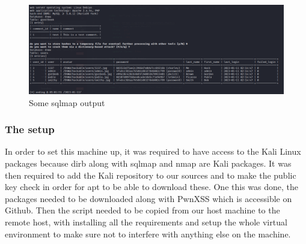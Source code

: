 \documentclass[a4paper,12pt,fleqn]{article}
\begin{document}
\begin{figure}[h]
    \centering
    \includegraphics[scale = 0.3]{images/sqlmap.png}
    \caption{Some sqlmap output}
\end{figure}

\subsubsection{The setup}

In order to set this machine up, it was required to have access to the Kali Linux packages because dirb along with sqlmap and nmap are Kali packages. It was then required to add the Kali repository to our sources and to make the public key check in order for apt to be able to download these. One this was done, the packages needed to be downloaded along with PwnXSS which is accessible on Github. Then the script needed to be copied from our host machine to the remote host, with installing all the requirements and setup the whole virtual environment to make sure not to interfere with anything else on the machine.
\end{document}
